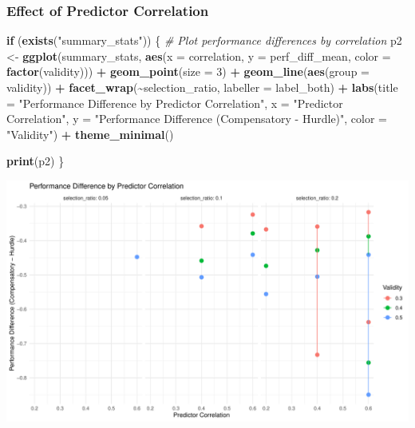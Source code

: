 \documentclass[
]{article}
\newenvironment{Shaded}{\begin{snugshade}}{\end{snugshade}}
\newcommand{\AttributeTok}[1]{\textcolor[rgb]{0.13,0.29,0.53}{#1}}
\newcommand{\CommentTok}[1]{\textcolor[rgb]{0.56,0.35,0.01}{\textit{#1}}}
\newcommand{\ControlFlowTok}[1]{\textcolor[rgb]{0.13,0.29,0.53}{\textbf{#1}}}
\newcommand{\DecValTok}[1]{\textcolor[rgb]{0.00,0.00,0.81}{#1}}
\newcommand{\FunctionTok}[1]{\textcolor[rgb]{0.13,0.29,0.53}{\textbf{#1}}}
\newcommand{\NormalTok}[1]{#1}
\newcommand{\OtherTok}[1]{\textcolor[rgb]{0.56,0.35,0.01}{#1}}
\newcommand{\SpecialCharTok}[1]{\textcolor[rgb]{0.81,0.36,0.00}{\textbf{#1}}}
\newcommand{\StringTok}[1]{\textcolor[rgb]{0.31,0.60,0.02}{#1}}
\begin{document}
\subsubsection{Effect of Predictor
Correlation}\label{effect-of-predictor-correlation}

\begin{Shaded}
\begin{Highlighting}[]
\ControlFlowTok{if}\NormalTok{ (}\FunctionTok{exists}\NormalTok{(}\StringTok{"summary\_stats"}\NormalTok{)) \{}
  \CommentTok{\# Plot performance differences by correlation}
\NormalTok{  p2 }\OtherTok{\textless{}{-}} \FunctionTok{ggplot}\NormalTok{(summary\_stats, }\FunctionTok{aes}\NormalTok{(}\AttributeTok{x =}\NormalTok{ correlation, }\AttributeTok{y =}\NormalTok{ perf\_diff\_mean, }
                                 \AttributeTok{color =} \FunctionTok{factor}\NormalTok{(validity))) }\SpecialCharTok{+}
    \FunctionTok{geom\_point}\NormalTok{(}\AttributeTok{size =} \DecValTok{3}\NormalTok{) }\SpecialCharTok{+}
    \FunctionTok{geom\_line}\NormalTok{(}\FunctionTok{aes}\NormalTok{(}\AttributeTok{group =}\NormalTok{ validity)) }\SpecialCharTok{+}
    \FunctionTok{facet\_wrap}\NormalTok{(}\SpecialCharTok{\textasciitilde{}}\NormalTok{selection\_ratio, }\AttributeTok{labeller =}\NormalTok{ label\_both) }\SpecialCharTok{+}
    \FunctionTok{labs}\NormalTok{(}\AttributeTok{title =} \StringTok{"Performance Difference by Predictor Correlation"}\NormalTok{,}
         \AttributeTok{x =} \StringTok{"Predictor Correlation"}\NormalTok{,}
         \AttributeTok{y =} \StringTok{"Performance Difference (Compensatory {-} Hurdle)"}\NormalTok{,}
         \AttributeTok{color =} \StringTok{"Validity"}\NormalTok{) }\SpecialCharTok{+}
    \FunctionTok{theme\_minimal}\NormalTok{()}
  
  \FunctionTok{print}\NormalTok{(p2)}
\NormalTok{\}}
\end{Highlighting}
\end{Shaded}

\begin{center}\includegraphics{ock_oswald_2018_report_files/figure-latex/correlation_effect-1} \end{center}
\end{document}
